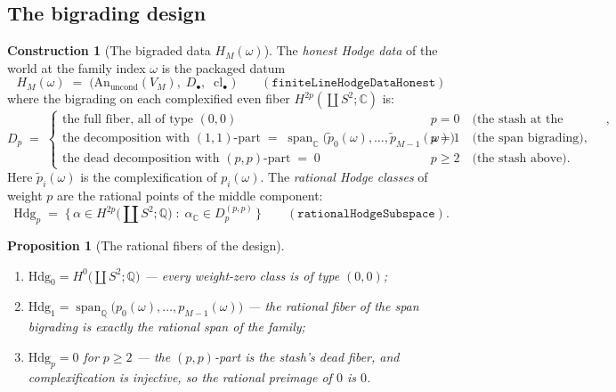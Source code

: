 \documentclass[11pt,a4paper]{article}
\theoremstyle{plain}
\newtheorem{proposition}[theorem]{Proposition}
\theoremstyle{definition}
\newtheorem{construction}[theorem]{Construction}
\newcommand{\Q}{\mathbb{Q}}
\newcommand{\C}{\mathbb{C}}
\newcommand{\Span}{\operatorname{span}}
\newcommand{\cl}{\operatorname{cl}}
\begin{document}
\subsection{The bigrading design}

\begin{construction}[The bigraded data $H_M(\omega)$]
\label{con:honest-data}
The \emph{honest Hodge data} of the world at the family index
$\omega$ is the packaged datum
\[
H_M(\omega) \;=\; \bigl(\mathrm{An}_{\mathrm{uncond}}(V_M),\;
D_\bullet,\; \cl_\bullet\bigr)
\qquad
(\texttt{finiteLineHodgeDataHonest})
\]
where the bigrading on each complexified even fiber
$H^{2p}(\coprod S^2;\C)$ is:
\[
D_p \;=\;
\begin{cases}
\text{the full fiber, all of type $(0,0)$} & p = 0 \quad
\text{(the stash at the bottom)},\\[2pt]
\text{the decomposition with $(1,1)$-part} \;=\; \Span_\C\!\bigl(
\tilde p_0(\omega), \dots, \tilde p_{M-1}(\omega) \bigr) & p = 1
\quad \text{(the span bigrading)},\\[2pt]
\text{the dead decomposition with $(p,p)$-part} \;=\; 0 & p \ge 2
\quad \text{(the stash above)}.
\end{cases}
\]
Here $\tilde p_i(\omega)$ is the complexification of $p_i(\omega)$.
The \emph{rational Hodge classes} of weight $p$ are the rational
points of the middle component:
\[
\mathrm{Hdg}_p \;=\; \bigl\{\, \alpha \in H^{2p}\bigl(\coprod S^2;\Q\bigr)
\;:\; \alpha_\C \in D_p^{(p,p)} \,\bigr\}
\qquad (\texttt{rationalHodgeSubspace}).
\]
\end{construction}

\begin{proposition}[The rational fibers of the design]
\label{prop:fibers}
\begin{enumerate}
\item $\mathrm{Hdg}_0 = H^0\bigl(\coprod S^2;\Q\bigr)$ --- every
weight-zero class is of type $(0,0)$;
\item $\mathrm{Hdg}_1 = \Span_\Q\bigl( p_0(\omega), \dots,
p_{M-1}(\omega) \bigr)$ --- the rational fiber of the span bigrading
is exactly the rational span of the family;
\item $\mathrm{Hdg}_p = 0$ for $p \ge 2$ --- the $(p,p)$-part is the
stash's dead fiber, and complexification is injective, so the
rational preimage of $0$ is $0$.
\end{enumerate}
\end{proposition}
\end{document}
